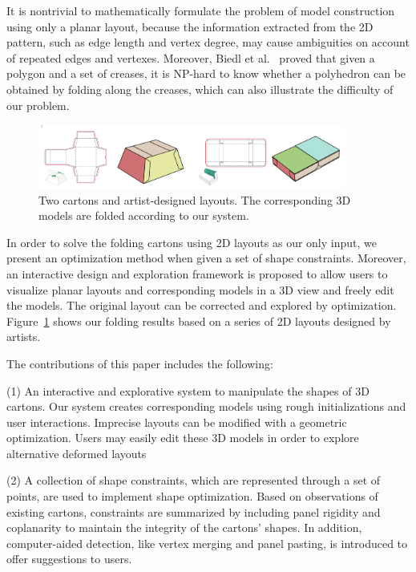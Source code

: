 It is nontrivial to mathematically formulate the problem of model construction using only a planar layout, because the information extracted from the 2D pattern, such as edge length and vertex degree, may cause ambiguities on account of repeated edges and vertexes. 
Moreover, Biedl et al.~\cite{Biedl:2005:NFP:1090462.1646553} proved that given a polygon and a set of creases, it is NP-hard to know whether a polyhedron can be obtained by folding along the creases, which can also illustrate the difficulty of our problem.

\begin{figure}
	\centering
	\includegraphics[width=0.9\textwidth]{images/artist}
	\caption{Two cartons and artist-designed layouts. The corresponding 3D models are folded according to our system.}
	\label{fig:artist}
\end{figure}

 
 
In order to solve the folding cartons using 2D layouts as our only input, we present an optimization method when given a set of shape constraints.
Moreover, an interactive design and exploration framework is proposed to allow users to visualize planar layouts and corresponding models in a 3D view and freely edit the models. 
The original layout can be corrected and explored by optimization. Figure~\ref{fig:artist} shows our folding results based on a series of 2D layouts designed by artists. 

The contributions of this paper includes the following:

(1) An interactive and explorative system to manipulate the shapes of 3D cartons. Our system creates corresponding models using rough initializations and user interactions. Imprecise layouts can be modified with a geometric optimization. Users may easily edit these 3D models in order to explore alternative deformed layouts

(2) A collection of shape constraints, which are represented through a set of points, are used to implement shape optimization. Based on observations of existing cartons, constraints are summarized by including panel rigidity and coplanarity to maintain the integrity of the cartons' shapes. 
In addition, computer-aided detection, like vertex merging and panel pasting, is introduced to offer suggestions to users. 
